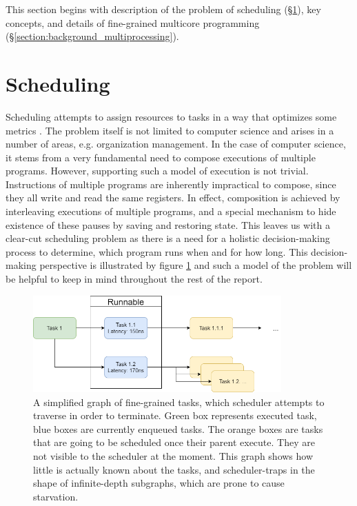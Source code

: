 \documentclass[12pt,a4paper,twoside]{report}
\begin{document}
This section begins with description of the problem of scheduling (\S\ref{section:background_schedulers}), key concepts, and details of fine-grained multicore programming (\S\ref{section:background_multiprocessing}).
\
\section{Scheduling}
\label{section:background_schedulers}

Scheduling attempts to assign resources to tasks in a way that optimizes some metrics \cite{Pinedo2012}. The problem itself is not limited to computer science and arises in a number of areas, e.g. organization management. In the case of computer science, it stems from a very fundamental need to compose executions of multiple programs. However, supporting such a model of execution is not trivial. Instructions of multiple programs are inherently impractical to compose, since they all write and read the same registers. In effect, composition is achieved by interleaving executions of multiple programs, and a special mechanism to hide existence of these pauses by saving and restoring state. This leaves us with a clear-cut scheduling problem as there is a need for a holistic decision-making process to determine, which program runs when and for how long. This decision-making perspective is illustrated by figure \ref{fig:sched-graph} and such a model of the problem will be helpful to keep in mind throughout the rest of the report. 


\begin{figure}
     \centering
     \includegraphics[width=0.85\textwidth]{scheduler_graph.png}
     \caption{A simplified graph of fine-grained tasks, which scheduler attempts to traverse in order to terminate. Green box represents executed task, blue boxes are currently enqueued tasks. The orange boxes are tasks that are going to be scheduled once their parent execute. They are not visible to the scheduler at the moment. This graph shows how little is actually known about the tasks, and scheduler-traps in the shape of infinite-depth subgraphs, which are prone to cause starvation.}
    \label{fig:sched-graph}
\end{figure}
\end{document}
